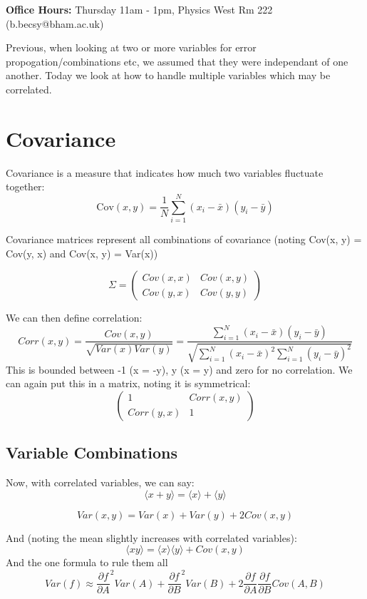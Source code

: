 \graphicspath{{figures/}}

\textbf{Office Hours:} Thursday 11am - 1pm, Physics West Rm 222 (b.becsy@bham.ac.uk)

Previous, when looking at two or more variables for error propogation/combinations etc, we assumed that they were independant of one another. Today we look at how to handle multiple variables which may be correlated.

\section*{Covariance}
Covariance is a measure that indicates how much two variables fluctuate together:
\[
\text{Cov}(x,y) = \frac{1}{N} \sum_{i=1}^{N} (x_i - \bar{x})(y_i - \bar{y})
\]

Covariance matrices represent all combinations of covariance (noting Cov(x, y) = Cov(y, x) and Cov(x, y) = Var(x))

$$\Sigma = \begin{pmatrix}
    Cov(x, x) & Cov(x, y) \\
    Cov(y, x) & Cov(y, y)
\end{pmatrix}$$

We can then define correlation:
\[
    Corr(x, y) = \frac{Cov(x, y)}{\sqrt{Var(x)Var(y)}} = \frac{\sum_{i=1}^{N} (x_i - \bar{x})(y_i-\bar{y})}{\sqrt{\sum_{i=1}^{N} (x_i - \bar{x})^2 \sum_{i=1}^{N} (y_i - \bar{y})^2}}
\]
This is bounded between -1 (x = -y), y (x = y) and zero for no correlation. We can again put this in a matrix, noting it is symmetrical:
\[
    \begin{pmatrix}
    1 & Corr(x, y) \\
    Corr(y, x) & 1
    \end{pmatrix}
\]

\subsection*{Variable Combinations}
Now, with correlated variables, we can say:
\[
    \langle x + y\rangle = \langle x\rangle + \langle y\rangle
\]

\[
    Var(x, y) = Var(x) + Var(y) + 2Cov(x, y)
\]

And (noting the mean slightly increases with correlated variables):
\[
    \langle xy\rangle = \langle x\rangle \langle y\rangle + Cov(x, y)
\]
And the one formula to rule them all
\[
    Var(f) \approx \frac{\partial f}{\partial A}^2 Var(A) + \frac{\partial f}{\partial B}^2 Var(B) + 2 \frac{\partial f}{\partial A} \frac{\partial f}{\partial B} Cov(A, B)
\]



